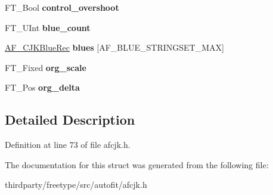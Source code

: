 \begin{DoxyCompactItemize}
F\+T\+\_\+\+Bool {\bfseries control\+\_\+overshoot}
\item 
\mbox{\label{struct_a_f___c_j_k_axis_rec___a197455ca873dda96b5458944ec232cab}} 
F\+T\+\_\+\+U\+Int {\bfseries blue\+\_\+count}
\item 
\mbox{\label{struct_a_f___c_j_k_axis_rec___af4106b74579d0449fbc9ccbdc1ac4be4}} 
\hyperlink{struct_a_f___c_j_k_blue_rec__}{A\+F\+\_\+\+C\+J\+K\+Blue\+Rec} {\bfseries blues} \mbox{[}A\+F\+\_\+\+B\+L\+U\+E\+\_\+\+S\+T\+R\+I\+N\+G\+S\+E\+T\+\_\+\+M\+AX\mbox{]}
\item 
\mbox{\label{struct_a_f___c_j_k_axis_rec___a78be1dfe71e60ed4af49ac8b8a6f6427}} 
F\+T\+\_\+\+Fixed {\bfseries org\+\_\+scale}
\item 
\mbox{\label{struct_a_f___c_j_k_axis_rec___a300faa708afee1028870dcc28256c864}} 
F\+T\+\_\+\+Pos {\bfseries org\+\_\+delta}
\end{DoxyCompactItemize}


\subsection{Detailed Description}


Definition at line 73 of file afcjk.\+h.



The documentation for this struct was generated from the following file\+:\begin{DoxyCompactItemize}
\item 
thirdparty/freetype/src/autofit/afcjk.\+h\end{DoxyCompactItemize}
